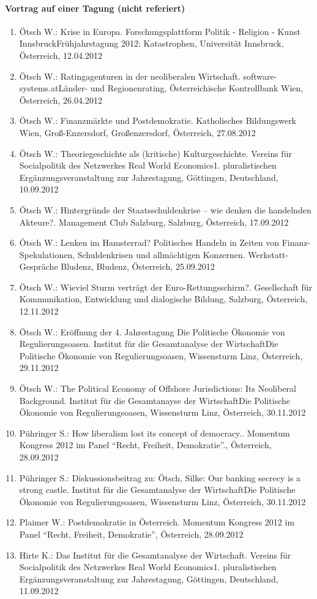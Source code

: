 \paragraph{Vortrag auf einer Tagung (nicht referiert)}
\begin{enumerate}
	\item Ötsch W.: Krise in Europa. Forschungsplattform Politik - Religion - Kunst InnsbruckFrühjahrstagung 2012: Katastrophen, Universität Innsbruck, Österreich, 12.04.2012
	\item Ötsch W.: Ratingagenturen in der neoliberalen Wirtschaft. software-systems.atLänder- und Regionenrating, Österreichische Kontrollbank Wien, Österreich, 26.04.2012
	\item Ötsch W.: Finanzmärkte und Postdemokratie. Katholisches Bildungswerk Wien, Groß-Enzersdorf, Großenzersdorf, Österreich, 27.08.2012
	\item Ötsch W.: Theoriegeschichte als (kritische) Kulturgeschichte. Vereins für Socialpolitik des Netzwerkes Real World Economics1. pluralistischen Ergänzungsveranstaltung zur Jahrestagung, Göttingen, Deutschland, 10.09.2012
	\item Ötsch W.: Hintergründe der Staatsschuldenkrise – wie denken die handelnden Akteure?. Management Club Salzburg, Salzburg, Österreich, 17.09.2012
	\item Ötsch W.: Lenken im Hamsterrad? Politisches Handeln in Zeiten von Finanz-Spekulationen, Schuldenkrisen und allmächtigen Konzernen. Werkstatt-Gespräche Bludenz, Bludenz, Österreich, 25.09.2012
	\item Ötsch W.: Wieviel Sturm verträgt der Euro-Rettungsschirm?. Gesellschaft für Kommunikation, Entwicklung und dialogische Bildung, Salzburg, Österreich, 12.11.2012
	\item Ötsch W.: Eröffnung der 4. Jahrestagung Die Politische Ökonomie von Regulierungsoasen. Institut für die Gesamtanalyse der WirtschaftDie Politische Ökonomie von Regulierungsoasen, Wissensturm Linz, Österreich, 29.11.2012
	\item Ötsch W.: The Political Economy of Offshore Jurisdictions: Its Neoliberal Background. Institut für die Gesamtanayse der WirtschaftDie Politische Ökonomie von Regulierungsoasen, Wissensturm Linz, Österreich, 30.11.2012
	\item Pühringer S.: How liberalism lost its concept of democracy.. Momentum Kongress 2012 im Panel “Recht, Freiheit, Demokratie”., Österreich, 28.09.2012
	\item Pühringer S.: Diskussionsbeitrag zu: Ötsch, Silke: Our banking secrecy is a strong castle. Institut für die Gesamtanalyse der WirtschaftDie Politische Ökonomie von Regulierungsoasen, Wissensturm Linz, Österreich, 30.11.2012
	\item Plaimer W.: Postdemokratie in Österreich. Momentum Kongress 2012 im Panel “Recht, Freiheit, Demokratie”, Österreich, 28.09.2012
	\item Hirte K.: Das Institut für die Gesamtanalyse der Wirtschaft. Vereins für Socialpolitik des Netzwerkes Real World Economics1. pluralistischen Ergänzungsveranstaltung zur Jahrestagung, Göttingen, Deutschland, 11.09.2012
\end{enumerate}
